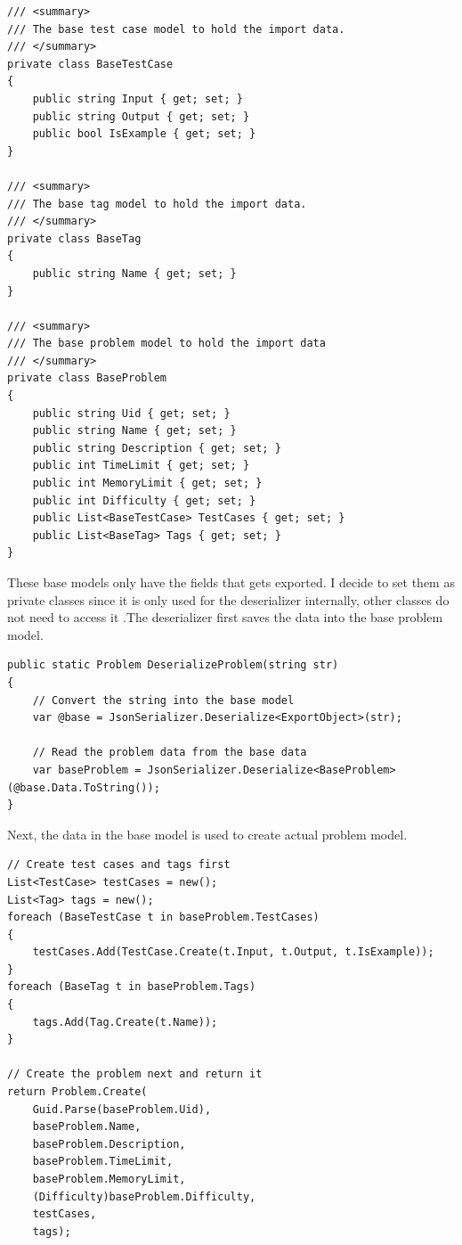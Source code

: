 \documentclass[a4paper]{report}
\begin{document}
\begin{verbatim}
/// <summary>
/// The base test case model to hold the import data.
/// </summary>
private class BaseTestCase
{
    public string Input { get; set; }
    public string Output { get; set; }
    public bool IsExample { get; set; }
}

/// <summary>
/// The base tag model to hold the import data.
/// </summary>
private class BaseTag
{
    public string Name { get; set; }
}

/// <summary>
/// The base problem model to hold the import data
/// </summary>
private class BaseProblem
{
    public string Uid { get; set; }
    public string Name { get; set; }
    public string Description { get; set; }
    public int TimeLimit { get; set; }
    public int MemoryLimit { get; set; }
    public int Difficulty { get; set; }
    public List<BaseTestCase> TestCases { get; set; }
    public List<BaseTag> Tags { get; set; }
}
\end{verbatim}

These base models only have the fields that gets exported. I decide to set them as private classes since it is only used for the deserializer internally, other classes do not need to access it .The deserializer first saves the data into the base problem model.

\begin{verbatim}
public static Problem DeserializeProblem(string str)
{
    // Convert the string into the base model
    var @base = JsonSerializer.Deserialize<ExportObject>(str);

    // Read the problem data from the base data
    var baseProblem = JsonSerializer.Deserialize<BaseProblem>(@base.Data.ToString());
}
\end{verbatim}

Next, the data in the base model is used to create actual problem model.

\begin{verbatim}
// Create test cases and tags first
List<TestCase> testCases = new();
List<Tag> tags = new();
foreach (BaseTestCase t in baseProblem.TestCases)
{
    testCases.Add(TestCase.Create(t.Input, t.Output, t.IsExample));
}
foreach (BaseTag t in baseProblem.Tags)
{
    tags.Add(Tag.Create(t.Name));
}

// Create the problem next and return it
return Problem.Create(
    Guid.Parse(baseProblem.Uid),
    baseProblem.Name,
    baseProblem.Description,
    baseProblem.TimeLimit,
    baseProblem.MemoryLimit,
    (Difficulty)baseProblem.Difficulty,
    testCases,
    tags);
\end{verbatim}
\end{document}
